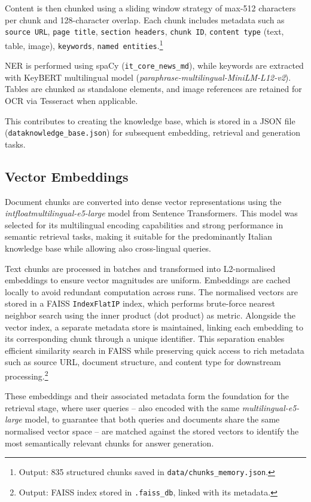 \begin{spacing}{1.5}
Content is then chunked using a sliding window strategy of max-512 characters per chunk and 128-character overlap. Each chunk includes metadata such as \texttt{source URL}, \texttt{page title}, \texttt{section headers}, \texttt{chunk ID}, \texttt{content type} (text, table, image), \texttt{keywords}, \texttt{named entities}.\footnote{Output: 835 structured chunks saved in \texttt{data/chunks\_memory.json}.}

NER is performed using spaCy (\texttt{it\_core\_news\_md}), while keywords are extracted with KeyBERT multilingual model (\textit{paraphrase-multilingual-MiniLM-L12-v2}). Tables are chunked as standalone elements, and image references are retained for OCR via Tesseract when applicable.

This contributes to creating the knowledge base, which is stored in a JSON file (\texttt{data\/knowledge\_base.json}) for subsequent embedding, retrieval and generation tasks.

\sloppy
\subsection{Vector Embeddings}
Document chunks are converted into dense vector representations using the \textit{intfloat\/multilingual-e5-large} model from Sentence Transformers. This model was selected for its multilingual encoding capabilities and strong performance in semantic retrieval tasks, making it suitable for the predominantly Italian knowledge base while allowing also cross-lingual queries. 

Text chunks are processed in batches and transformed into L2-normalised embeddings to ensure vector magnitudes are uniform. Embeddings are cached locally to avoid redundant computation across runs. The normalised vectors are stored in a FAISS \texttt{IndexFlatIP} index, which performs brute-force nearest neighbor search using the inner product (dot product) as metric. Alongside the vector index, a separate metadata store is maintained, linking each embedding to its corresponding chunk through a unique identifier. This separation enables efficient similarity search in FAISS while preserving quick access to rich metadata such as source URL, document structure, and content type for downstream processing.\footnote{Output: FAISS index stored in \texttt{.faiss\_db}, linked with its metadata.}

These embeddings and their associated metadata form the foundation for the retrieval stage, where user queries -- also encoded with the same \textit{multilingual-e5-large} model, to guarantee that both queries and documents share the same normalised vector space -- are matched against the stored vectors to identify the most semantically relevant chunks for answer generation.


\end{spacing}
